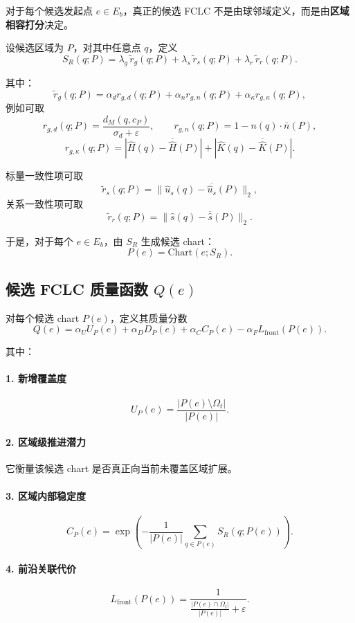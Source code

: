 \documentclass[12pt,a4paper]{ctexart}
\begin{document}
对于每个候选发起点 \(e\in E_b\)，真正的候选 FCLC 不是由球邻域定义，而是由\textbf{区域相容打分}决定。

设候选区域为 \(P\)，对其中任意点 \(q\)，定义
\[
S_R(q;P)
=
\lambda_g\,\tilde r_g(q;P)
+
\lambda_s\,\tilde r_s(q;P)
+
\lambda_r\,\tilde r_r(q;P).
\]

其中：
\[
\tilde r_g(q;P)
=
\alpha_d r_{g,d}(q;P)
+
\alpha_n r_{g,n}(q;P)
+
\alpha_\kappa r_{g,\kappa}(q;P),
\]
例如可取
\[
r_{g,d}(q;P)=\frac{d_M(q,c_P)}{\sigma_d+\varepsilon},
\qquad
r_{g,n}(q;P)=1-n(q)\cdot \bar n(P),
\]
\[
r_{g,\kappa}(q;P)=
|\hat H(q)-\overline{\hat H}(P)|
+
|\hat K(q)-\overline{\hat K}(P)|.
\]

标量一致性项可取
\[
\tilde r_s(q;P)=
\|\hat u_s(q)-\overline{\hat u_s}(P)\|_2,
\]
关系一致性项可取
\[
\tilde r_r(q;P)=
\|\hat s(q)-\overline{\hat s}(P)\|_2.
\]

于是，对于每个 \(e\in E_b\)，由 \(S_R\) 生成候选 chart：
\[
P(e)=\mathrm{Chart}(e;S_R).
\]

\subsection{候选 FCLC 质量函数 \(Q(e)\)}

对每个候选 chart \(P(e)\)，定义其质量分数
\[
Q(e)
=
\alpha_U U_P(e)
+
\alpha_D D_P(e)
+
\alpha_C C_P(e)
-
\alpha_F L_{\mathrm{front}}(P(e)).
\]

其中：

\paragraph{1. 新增覆盖度}
\[
U_P(e)=\frac{|P(e)\setminus\Omega_t|}{|P(e)|}.
\]

\paragraph{2. 区域级推进潜力}
它衡量该候选 chart 是否真正向当前未覆盖区域扩展。

\paragraph{3. 区域内部稳定度}
\[
C_P(e)=
\exp\!\left(
-\frac1{|P(e)|}\sum_{q\in P(e)}S_R(q;P(e))
\right).
\]

\paragraph{4. 前沿关联代价}
\[
L_{\mathrm{front}}(P(e))
=
\frac{1}{\frac{|P(e)\cap\Omega_t|}{|P(e)|}+\varepsilon}.
\]
\end{document}
